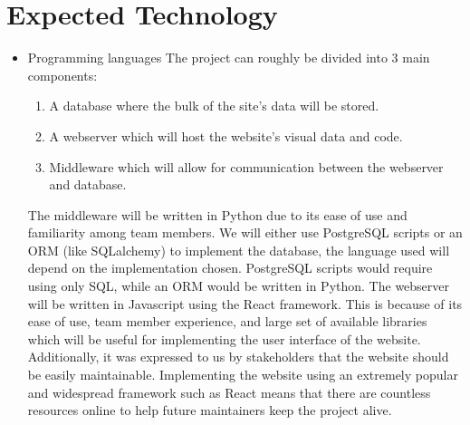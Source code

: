 \documentclass{article}
\begin{document}
\section{Expected Technology}

\begin{itemize}
\item Programming languages
\subitem The project can roughly be divided into 3 main components:
\begin{enumerate}
  \item A database where the bulk of the site's data will be stored.
  \item A webserver which will host the website's visual data and code.
  \item Middleware which will allow for communication between the 
  webserver and database.
\end{enumerate}
\subitem The middleware will be written in Python due to its ease of use and 
familiarity among team members.
\subitem We will either use PostgreSQL scripts or an ORM (like SQLalchemy) 
to implement the database, the language used will depend on the implementation 
chosen. PostgreSQL scripts would require using only SQL, while an ORM would be written in Python.
\subitem The webserver will be written in Javascript using the React framework.
This is because of its ease of use, team member experience, and large set 
of available libraries which will be useful for implementing the user interface of the website. Additionally, it was expressed to us by stakeholders that the 
website should be easily maintainable. Implementing the website using an 
extremely popular and widespread framework such as React means that there 
are countless resources online to help future maintainers keep the project alive.


\end{itemize}
\end{document}
